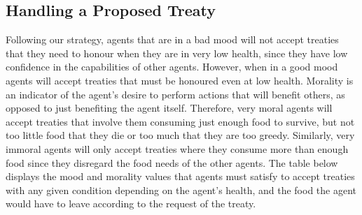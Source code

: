 \subsection{Handling a Proposed Treaty}
Following our strategy, agents that are in a bad mood will not accept treaties that they need to honour when they are in very low health, since they have low confidence in the capabilities of other agents. However, when in a good mood agents will accept treaties that must be honoured even at low health. Morality is an indicator of the agent’s desire to perform actions that will benefit others, as opposed to just benefiting the agent itself. Therefore, very moral agents will accept treaties that involve them consuming just enough food to survive, but not too little food that they die or too much that they are too greedy. Similarly, very immoral agents will only accept treaties where they consume more than enough food since they disregard the food needs of the other agents. The table below displays the mood and morality values that agents must satisfy to accept treaties with any given condition depending on the agent’s health, and the food the agent would have to leave according to the request of the treaty. \par

